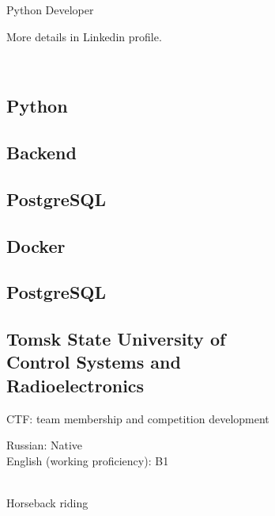 \documentclass[a4paper]{MagicalCV}
\begin{document}
\lastupdated


\begin{minipage}[t]{0.33\textwidth} 


Python Developer

More details in Linkedin profile.
\sectionsep


\\


\sectionsep


\subsection{Python}
\subsection{Backend}
\subsection{PostgreSQL}
\subsection{Docker}

\subsection{PostgreSQL}


\subsection{Tomsk State University of \\ Control Systems and \\ Radioelectronics}
\vspace{\topsep} %
CTF: team membership and competition development
\sectionsep


Russian: Native\\
English (working proficiency): B1
\sectionsep

\\
Horseback riding
\sectionsep


\end{minipage} 
\end{document}
